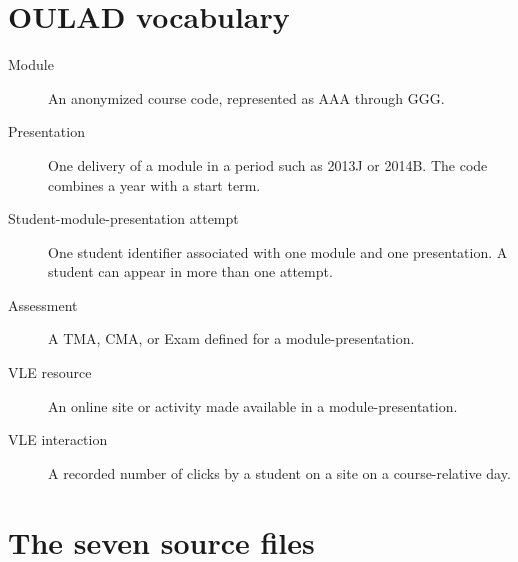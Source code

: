 \section{OULAD vocabulary}

\begin{description}
  \item[Module] An anonymized course code, represented as AAA through GGG.
  \item[Presentation] One delivery of a module in a period such as 2013J or
    2014B. The code combines a year with a start term.
  \item[Student-module-presentation attempt] One student identifier associated
    with one module and one presentation. A student can appear in more than one
    attempt.
  \item[Assessment] A TMA, CMA, or Exam defined for a module-presentation.
  \item[VLE resource] An online site or activity made available in a
    module-presentation.
  \item[VLE interaction] A recorded number of clicks by a student on a site on a
    course-relative day.
\end{description}

\section{The seven source files}

